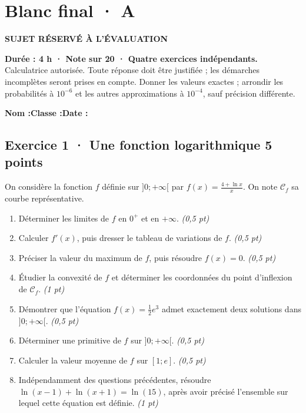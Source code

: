 \fi

\ifprof

\clearpage{}\label{sujet:9-3}

\section*{Blanc final · A}

{\sffamily\bfseries\color{amber}SUJET RÉSERVÉ À L'ÉVALUATION\par}

\textbf{Durée : 4 h · Note sur 20 · Quatre exercices indépendants.}\\Calculatrice autorisée. Toute réponse doit être justifiée ; les démarches incomplètes seront prises en compte. Donner les valeurs exactes ; arrondir les probabilités à $10^{-6}$ et les autres approximations à $10^{-4}$, sauf précision différente.

\smallskip\textbf{Nom :}\enspace\dotfill\quad\textbf{Classe :}\enspace\dotfill\quad\textbf{Date :}\enspace\dotfill

\subsection*{Exercice 1 · Une fonction logarithmique \hfill 5 points}On considère la fonction $f$ définie sur $]0;+\infty[$ par $f(x)=\frac{4+\ln x}x$. On note $\mathcal C_f$ sa courbe représentative.

\begin{enumerate}

\item Déterminer les limites de $f$ en $0^+$ et en $+\infty$. \hfill\textit{(0,5 pt)}

\item Calculer $f' (x)$, puis dresser le tableau de variations de $f$. \hfill\textit{(0,5 pt)}

\item Préciser la valeur du maximum de $f$, puis résoudre $f(x)=0$. \hfill\textit{(0,5 pt)}

\item Étudier la convexité de $f$ et déterminer les coordonnées du point d'inflexion de $\mathcal C_f$. \hfill\textit{(1 pt)}

\item Démontrer que l'équation $f(x)=\frac12 e^{3}$ admet exactement deux solutions dans $]0;+\infty[$. \hfill\textit{(0,5 pt)}

\item Déterminer une primitive de $f$ sur $]0;+\infty[$. \hfill\textit{(0,5 pt)}

\item Calculer la valeur moyenne de $f$ sur $[1;e]$. \hfill\textit{(0,5 pt)}

\item Indépendamment des questions précédentes, résoudre $\ln(x-1)+\ln(x+1)=\ln(15)$, après avoir précisé l'ensemble sur lequel cette équation est définie. \hfill\textit{(1 pt)}

\end{enumerate}

